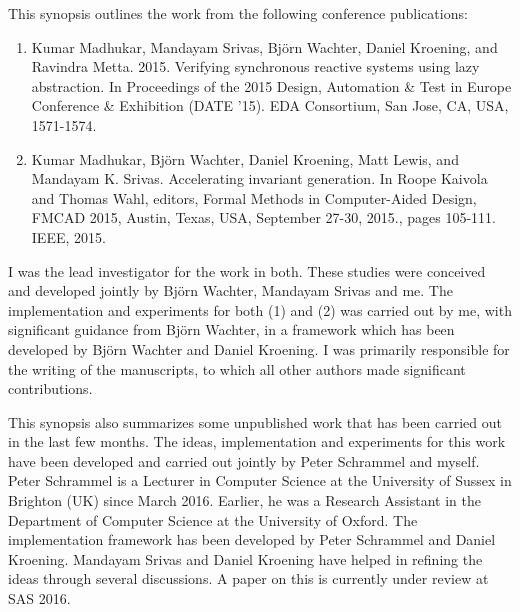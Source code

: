 \begin{originality}
  This synopsis outlines the work from the following conference publications:
  \begin{enumerate}
  \item Kumar Madhukar, Mandayam Srivas, Bj\"{o}rn Wachter, Daniel Kroening,
and Ravindra Metta. 2015. Verifying synchronous reactive systems using lazy
abstraction. In Proceedings of the 2015 Design, Automation \& Test in Europe
Conference \& Exhibition (DATE '15). EDA Consortium, San Jose, CA, USA,
1571-1574.

  \item Kumar Madhukar, Bj\"{o}rn Wachter, Daniel Kroening, Matt Lewis, and
Mandayam K. Srivas. Accelerating invariant generation. In Roope Kaivola and
Thomas Wahl, editors, Formal Methods in Computer-Aided Design, FMCAD 2015,
Austin, Texas, USA, September 27-30, 2015., pages 105-111. IEEE, 2015.
  \end{enumerate}

  I was the lead investigator for the work in both. These studies were
conceived and developed jointly by Bj\"{o}rn Wachter, Mandayam Srivas and me.
The implementation and experiments for both (1) and (2) was carried out by me,
with significant guidance from Bj\"{o}rn Wachter, in a framework which has been
developed by Bj\"{o}rn Wachter and Daniel Kroening. I was primarily responsible
for the writing of the manuscripts, to which all other authors made significant
contributions.

  This synopsis also summarizes some unpublished work that has been carried out
in the last few months. The ideas, implementation and experiments for this work
have been developed and carried out jointly by Peter Schrammel and myself.
Peter Schrammel is a Lecturer in Computer Science at the University of Sussex
in Brighton (UK) since March 2016. Earlier, he was a Research Assistant in the
Department of Computer Science at the University of Oxford. The implementation
framework has been developed by Peter Schrammel and Daniel Kroening. Mandayam
Srivas and Daniel Kroening have helped in refining the ideas through several
discussions. A paper on this is currently under review at SAS 2016.
  
\end{originality}
